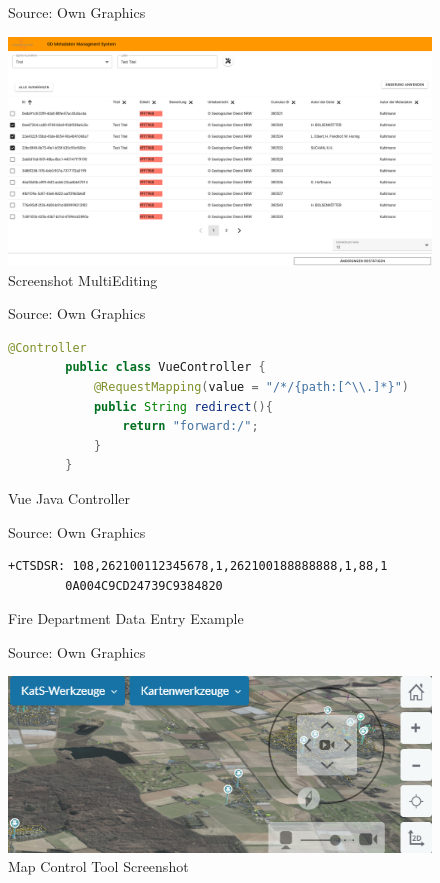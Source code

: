 \documentclass[11pt, titlepage, a4paper]{article}
\newcommand{\source}[1]{\caption*{Source: {#1}} }
\begin{document}
\begin{appendices}
\begin{figure}[H]
        \caption{Screenshot MultiEditing}
        \source{Own Graphics}
        \label{fig:multiedit}
        \includegraphics[width=16cm]{multiedit.png}
        \centering
    \end{figure}
    \begin{figure}[H]
        \caption{Vue Java Controller}
        \source{Own Graphics}
        \label{fig:vue}
        \begin{lstlisting}[language=java, frame=single]
        @Controller
        public class VueController {
            @RequestMapping(value = "/*/{path:[^\\.]*}")
            public String redirect(){
                return "forward:/";
            }
        }
        \end{lstlisting}
        \centering
    \end{figure}
    \begin{figure}[t]
        \caption{Fire Department Data Entry Example}
        \source{Own Graphics}
        \label{fig:pei}
        \begin{lstlisting}[frame=single]
        +CTSDSR: 108,262100112345678,1,262100188888888,1,88,1
        0A004C9CD24739C9384820
    \end{lstlisting}
        \centering
    \end{figure}

    \begin{figure}[H]
        \caption{Map Control Tool Screenshot}
        \source{Own Graphics}
        \label{fig:mapcontrol}
        \includegraphics[width=16cm]{dzgefahr_mapcontrol.png}
        \centering
    \end{figure}
\end{appendices}
\end{document}
